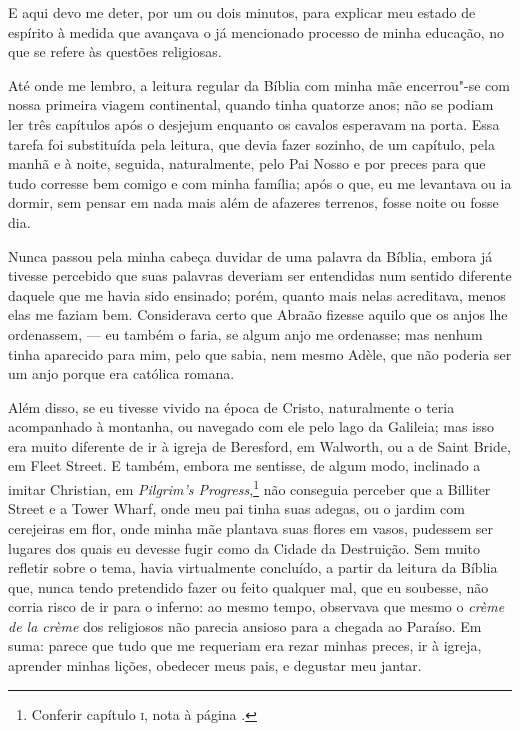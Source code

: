 E aqui devo me deter, por um ou dois minutos, para explicar meu
estado de espírito à medida que avançava o já mencionado processo de
minha educação, no que se refere às questões religiosas.

Até onde me lembro, a leitura regular da Bíblia com minha mãe
encerrou"-se com nossa primeira viagem continental, quando tinha quatorze
anos; não se podiam ler três capítulos após o desjejum enquanto os
cavalos esperavam na porta. Essa tarefa foi substituída pela leitura,
que devia fazer sozinho, de um capítulo, pela manhã e à noite, seguida,
naturalmente, pelo Pai Nosso e por preces para que tudo corresse bem
comigo e com minha família; após o que, eu me levantava ou ia dormir,
sem pensar em nada mais além de afazeres terrenos, fosse noite ou fosse
dia.

Nunca passou pela minha cabeça duvidar de uma palavra da Bíblia, embora
já tivesse percebido que suas palavras deveriam ser entendidas num
sentido diferente daquele que me havia sido ensinado; porém, quanto mais
nelas acreditava, menos elas me faziam bem. Considerava certo que Abraão
fizesse aquilo que os anjos lhe ordenassem, --- eu também o faria, se
algum anjo me ordenasse; mas nenhum tinha aparecido para mim, pelo que
sabia, nem mesmo Adèle, que não poderia ser um anjo porque era católica
romana.

Além disso, se eu tivesse vivido na época de Cristo, naturalmente o
teria acompanhado à montanha, ou navegado com ele pelo lago da Galileia;
mas isso era muito diferente de ir à igreja de Beresford, em Walworth,
ou a de Saint Bride, em Fleet Street. E também, embora me sentisse, de
algum modo, inclinado a imitar Christian, em \textit{Pilgrim's
Progress},\footnote{Conferir capítulo \textsc{i}, nota à página \pageref{peregrino}.} não
conseguia perceber que a Billiter Street e a Tower Wharf, onde meu pai
tinha suas adegas, ou o jardim com cerejeiras em flor, onde minha mãe
plantava suas flores em vasos, pudessem ser lugares dos quais eu devesse
fugir como da Cidade da Destruição. Sem muito refletir sobre o tema,
havia virtualmente concluído, a partir da leitura da Bíblia que, nunca
tendo pretendido fazer ou feito qualquer mal, que eu soubesse, não
corria risco de ir para o inferno: ao mesmo tempo, observava que mesmo o
\textit{crème de la crème} dos religiosos não parecia ansioso para a
chegada ao Paraíso. Em suma: parece que tudo que me requeriam era rezar
minhas preces, ir à igreja, aprender minhas lições, obedecer meus pais,
e degustar meu jantar.

